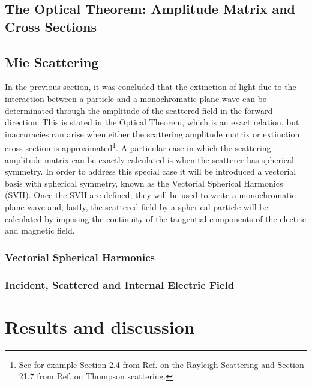 \documentclass[11pt]{Latex/Classes/PhDthesisPSnPDF}
\begin{document}
	\section{The Optical Theorem: Amplitude Matrix and Cross Sections}
	\label{section:AmpMatCrossSect}
	

	\section{Mie Scattering}
	\label{section:Mie}

In the previous section, it was concluded that the extinction of light due to the interaction between a particle and a monochromatic plane wave can be determinated through the amplitude of the scattered field in the forward direction. This is stated in the Optical Theorem, which is an exact relation, but inaccuracies can arise when either the scattering amplitude matrix or extinction cross section is approximated\footnote{See for example Section 2.4 from Ref. \cite{tsang_scattering_2000} on the Rayleigh Scattering and Section 21.7 from Ref. \cite{zangwill_modern_2013} on Thompson scattering.}. A particular case in which the scattering amplitude matrix can be exactly calculated is when the scatterer has spherical symmetry. In order to address this special case it will be introduced a vectorial basis with spherical symmetry, known as the Vectorial Spherical Harmonics (SVH). Once the SVH are defined, they will be used to write a monochromatic plane wave and, lastly, the scattered field by a spherical particle will be calculated by imposing the continuity of the tangential components of the electric and magnetic field.

	\subsection{Vectorial Spherical Harmonics}
		\label{ssection:SVH}		
		
	\subsection{Incident, Scattered and Internal Electric Field}
		\label{ssection:Fields}
		

\chapter{Results and discussion}
\end{document}
